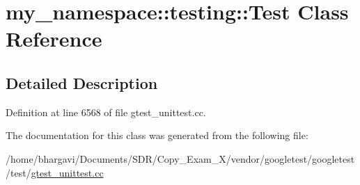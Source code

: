 \hypertarget{classmy__namespace_1_1testing_1_1_test}{}\section{my\+\_\+namespace\+:\+:testing\+:\+:Test Class Reference}
\label{classmy__namespace_1_1testing_1_1_test}


\subsection{Detailed Description}


Definition at line 6568 of file gtest\+\_\+unittest.\+cc.



The documentation for this class was generated from the following file\+:\begin{DoxyCompactItemize}
\item 
/home/bhargavi/\+Documents/\+S\+D\+R/\+Copy\+\_\+\+Exam\+\_\+X/vendor/googletest/googletest/test/\hyperlink{gtest__unittest_8cc}{gtest\+\_\+unittest.\+cc}\end{DoxyCompactItemize}
